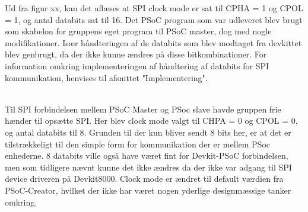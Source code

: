 Ud fra figur xx, kan det aflæses at SPI clock mode er sat til CPHA = 1 og CPOL = 1, og antal databits sat til 16. Det PSoC program som var udleveret blev brugt
som skabelon for gruppens eget program til PSoC master, dog med nogle modifikationer. Især håndteringen af de databits som blev modtaget fra devkittet blev 
genbrugt, da der ikke kunne ændres på disse bitkombinationer. For information omkring implementeringen af håndtering af databits for SPI kommunikation, 
henvises til afsnittet "Implementering".

\\
Til SPI forbindelsen mellem PSoC Master og PSoc slave havde gruppen frie hænder til opsætte SPI. Her blev clock mode valgt til CHPA = 0 og CPOL = 0, og 
antal databits til 8. Grunden til der kun bliver sendt 8 bits her, er at det er tilstrækkeligt til den simple form for kommunikation der er mellem PSoc enhederne.
8 databits ville også have været fint for Devkit-PSoC forbindelsen, men som tidligere nævnt kunne det ikke ændres da der ikke var adgang til SPI device driveren
på Devkit8000. Clock mode er ændret til default værdien fra PSoC-Creator, hvilket der ikke har været nogen yderlige designmæssige tanker omkring.